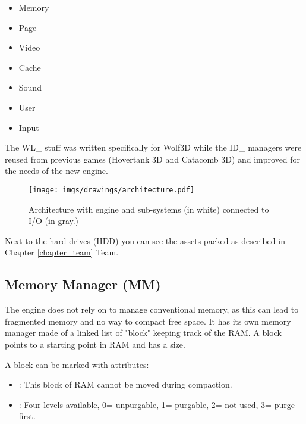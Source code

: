 \documentclass[book.tex]{subfiles}
\begin{document}
\begin{itemize}
	\item Memory
	\item Page
	\item Video
	\item Cache
	\item Sound
	\item User
	\item Input
\end{itemize}
\par
The WL\_ stuff was written specifically for Wolf3D while the ID\_ managers were reused from previous games (Hovertank 3D and Catacomb 3D) and improved for the needs of the new engine.

\begin{figure}[H]
\centering
\texttt{[image: imgs/drawings/architecture.pdf]}
\caption{Architecture with engine and sub-systems (in white) connected to I/O (in gray.)}
\label{fig:architecture}
\end{figure}
Next to the hard drives (HDD) you can see the assets packed as described in Chapter \ref{chapter_team} Team.










\subsection{Memory Manager (MM)}
The engine does not rely on  to manage conventional memory, as this can lead to fragmented memory and no way to compact free space. It has its own memory manager made of a linked list of "block" keeping track of the RAM. A block points to a starting point in RAM and has a size.\\
 \par

 \par
A block can be marked with attributes:
\begin{itemize}
\item {} : This block of RAM cannot be moved during compaction.
\item {} : Four levels available, 0= unpurgable, 1= purgable, 2= not used, 3= purge first.
\end{itemize}
\end{document}
